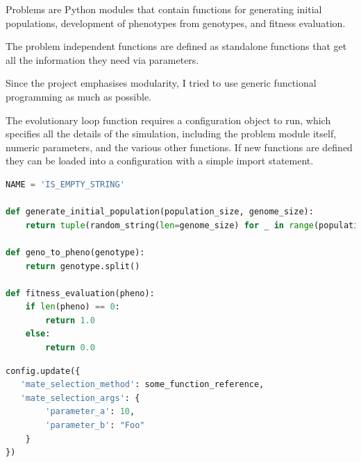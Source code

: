 Problems are Python modules that contain functions for generating initial populations,
development of phenotypes from genotypes, and fitness evaluation.

The problem independent functions are defined as standalone functions that get all the information they need via parameters.



Since the project emphasises modularity,
I tried to use generic functional programming as much as possible.

The evolutionary loop function requires a configuration object to run,
which specifies all the details of the simulation,
including the problem module itself,
numeric parameters,
and the various other functions.
If new functions are defined they can be loaded into a configuration with a simple import statement.

\begin{minipage}{\linewidth}
    \begin{lstlisting}[language=Python, caption=Creating a new problem type.]
NAME = 'IS_EMPTY_STRING'

def generate_initial_population(population_size, genome_size):
    return tuple(random_string(len=genome_size) for _ in range(population_size))

def geno_to_pheno(genotype):
    return genotype.split()

def fitness_evaluation(pheno):
    if len(pheno) == 0:
        return 1.0
    else:
        return 0.0
    \end{lstlisting}
\end{minipage}


\begin{minipage}{\linewidth}
    \begin{lstlisting}[language=Python, caption=Plugging in a different mate selection function.]
config.update({
   'mate_selection_method': some_function_reference,
   'mate_selection_args': {
        'parameter_a': 10,
        'parameter_b': "Foo"
    }
})
    \end{lstlisting}
\end{minipage}

